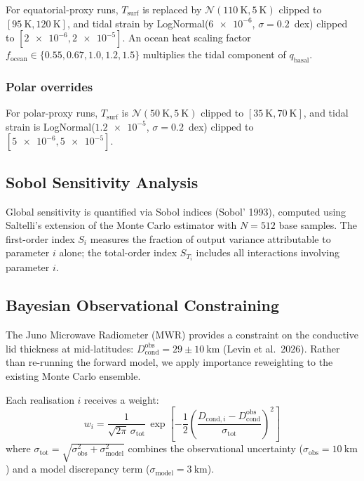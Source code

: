 \documentclass[11pt,a4paper]{article}
\begin{document}
For equatorial-proxy runs, $T_{\mathrm{surf}}$ is replaced by
$\mathcal{N}(\SI{110}{\kelvin}, \SI{5}{\kelvin})$ clipped to
$[\SI{95}{\kelvin}, \SI{120}{\kelvin}]$, and tidal strain by
LogNormal($\num{6e-6}$, $\sigma = 0.2$~dex) clipped to
$[\num{2e-6}, \num{2e-5}]$. An ocean heat scaling factor
$f_{\mathrm{ocean}} \in \{0.55, 0.67, 1.0, 1.2, 1.5\}$ multiplies
the tidal component of $q_{\mathrm{basal}}$.

\subsubsection{Polar overrides}

For polar-proxy runs, $T_{\mathrm{surf}}$ is
$\mathcal{N}(\SI{50}{\kelvin}, \SI{5}{\kelvin})$ clipped to
$[\SI{35}{\kelvin}, \SI{70}{\kelvin}]$, and tidal strain is
LogNormal($\num{1.2e-5}$, $\sigma = 0.2$~dex) clipped to
$[\num{5e-6}, \num{5e-5}]$.

\subsection{Sobol Sensitivity Analysis}

Global sensitivity is quantified via Sobol indices (Sobol' 1993),
computed using Saltelli's extension of the Monte Carlo estimator with
$N = 512$ base samples. The first-order index $S_i$ measures the
fraction of output variance attributable to parameter $i$ alone; the
total-order index $S_{T_i}$ includes all interactions involving
parameter $i$.

\subsection{Bayesian Observational Constraining}
\label{sec:bayes}

The Juno Microwave Radiometer (MWR) provides a constraint on the
conductive lid thickness at mid-latitudes:
$D_{\mathrm{cond}}^{\mathrm{obs}} = 29 \pm \SI{10}{\kilo\metre}$
(Levin et al.\ 2026). Rather than re-running the forward model, we
apply importance reweighting to the existing Monte Carlo ensemble.

Each realisation $i$ receives a weight:
\begin{equation}
w_i = \frac{1}{\sqrt{2\pi}\,\sigma_{\mathrm{tot}}}\,
  \exp\!\left[-\frac{1}{2}
  \left(\frac{D_{\mathrm{cond},i} - D_{\mathrm{cond}}^{\mathrm{obs}}}
       {\sigma_{\mathrm{tot}}}\right)^{\!2}\right]
\label{eq:weights}
\end{equation}
where $\sigma_{\mathrm{tot}} = \sqrt{\sigma_{\mathrm{obs}}^2 +
\sigma_{\mathrm{model}}^2}$ combines the observational uncertainty
($\sigma_{\mathrm{obs}} = \SI{10}{\kilo\metre}$) and a model
discrepancy term ($\sigma_{\mathrm{model}} = \SI{3}{\kilo\metre}$).
\end{document}
